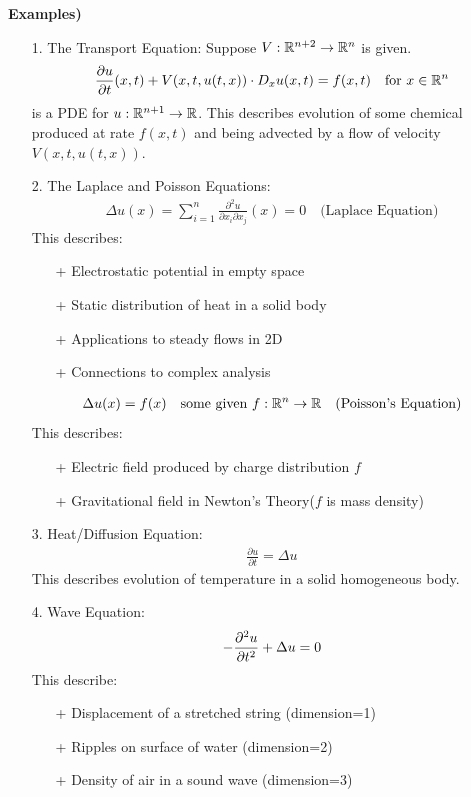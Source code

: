 \documentclass[10pt,a4paper]{report}
\begin{document}
\textbf{Examples)}
\begin{itemize}
\item[1.] The Transport Equation:
Suppose $V :\mathbb{R}^{n+2} \rightarrow \mathbb{R}^n$ is given.
\begin{align*}
\frac{\partial u}{\partial t}(x,t) + V(x,t,u(t,x)) \cdot D_x u (x,t) = f(x,t) \quad \text{for } x\in \mathbb{R}^n
\end{align*}
is a PDE for $u: \mathbb{R}^{n+1} \rightarrow \mathbb{R}$. This describes evolution of some chemical produced at rate $f(x,t)$ and being advected by a flow of velocity $V(x,t,u(t,x))$.

\item[2.] The Laplace and Poisson Equations:
\begin{align*}
\Delta u(x) = \sum_{i=1}^n \frac{\partial^2 u}{\partial x_i \partial x_j}(x)=0 \quad \text{(Laplace Equation)}
\end{align*}
This describes: \begin{itemize}
\item[+] Electrostatic potential in empty space
\item[+] Static distribution of heat in a solid body
\item[+] Applications to steady flows in 2D
\item[+] Connections to complex analysis
\end{itemize}

\begin{align*}
\Delta u(x) =f(x) \quad \text{some given } f: \mathbb{R}^n \rightarrow \mathbb{R} \quad \text{(Poisson's Equation)}
\end{align*}
This describes: \begin{itemize}
\item[+] Electric field produced by charge distribution $f$
\item[+] Gravitational field in Newton's Theory($f$ is mass density)
\end{itemize}

\item[3.] Heat/Diffusion Equation:
\begin{align*}
\frac{\partial u}{\partial t} = \Delta u
\end{align*}
This describes evolution of temperature in a solid homogeneous body.

\item[4.] Wave Equation:
\begin{align*}
-\frac{\partial^2 u}{\partial t^2} + \Delta u =0
\end{align*}
This describe: \begin{itemize}
\item[+] Displacement of a stretched string (dimension=1)
\item[+] Ripples on surface of water (dimension=2)
\item[+] Density of air in a sound wave (dimension=3)
\end{itemize}


\end{itemize}
\end{document}
